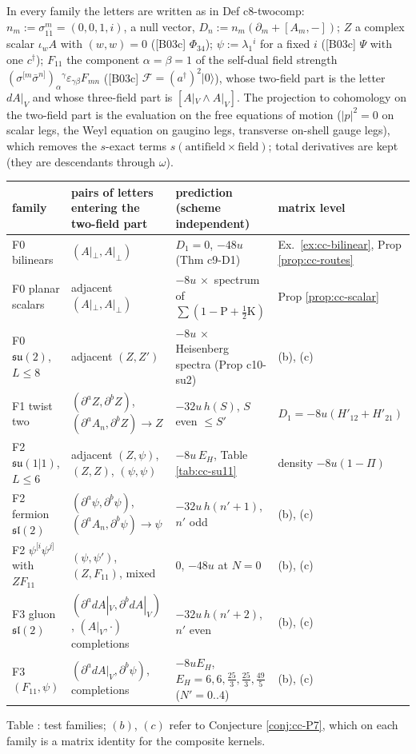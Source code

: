 \documentclass[11pt]{article}
\numberwithin{equation}{section}
\theoremstyle{plain}
\theoremstyle{definition}
\newcommand{\Ap}{A|_{\perp}}
\newcommand{\AV}{A|_V}
\begin{document}
In every family the letters are written as in Def c8-twocomp: $n_m:=\sigma^m_{1\dot1}=(0,0,1,i)$, a null vector, $D_n:=n_m(\partial_m+[A_m,-])$; $Z$ a complex scalar $\iota_wA$ with $(w,w)=0$ ([B03c] $\Phi_{34}$); $\psi:=\lambda_{1}{}^{i}$ for a fixed $i$ ([B03c] $\Psi$ with one $c^\dagger$); $F_{11}$ the component $\alpha=\beta=1$ of the self-dual field strength $(\sigma^{[m}\bar\sigma^{n]})_\alpha{}^\gamma\varepsilon_{\gamma\beta}F_{mn}$ ([B03c] $\mathcal F=(a^\dagger)^2|0\rangle$), whose two-field part is the letter $d\AV$ and whose three-field part is $[\AV\wedge\AV]$. The projection to cohomology on the two-field part is the evaluation on the free equations of motion ($|p|^2=0$ on scalar legs, the Weyl equation on gaugino legs, transverse on-shell gauge legs), which removes the $s$-exact terms $s(\text{antifield}\times\text{field})$; total derivatives are kept (they are descendants through $\omega$).

\begin{center}\small
\begin{tabular}{p{2.6cm}|p{5.2cm}|p{4.6cm}|p{3.4cm}}
family & pairs of letters entering the two-field part & prediction (scheme independent) & matrix level\\\hline
F0 bilinears & $(\Ap,\Ap)$ & $D_1=0$, $-48u$ (Thm c9-D1) & Ex.~\ref{ex:cc-bilinear}, Prop \ref{prop:cc-routes}\\
F0 planar scalars & adjacent $(\Ap,\Ap)$ & $-8u\,\times$ spectrum of $\sum(1-\mathrm P+\tfrac12\mathrm K)$ & Prop \ref{prop:cc-scalar}\\
F0 $\mathfrak{su}(2)$, $L\le8$ & adjacent $(Z,Z')$ & $-8u\,\times$ Heisenberg spectra (Prop c10-su2) & (b), (c)\\
F1 twist two & $(\partial^aZ,\partial^bZ)$, $(\partial^aA_n,\partial^bZ)\to Z$ & $-32u\,h(S)$, $S$ even $\le S'$ & $D_1=-8u(H'_{12}+H'_{21})$\\
F2 $\mathfrak{su}(1|1)$, $L\le6$ & adjacent $(Z,\psi)$, $(Z,Z)$, $(\psi,\psi)$ & $-8u\,E_H$, Table \ref{tab:cc-su11} & density $-8u(1-\Pi)$\\
F2 fermion $\mathfrak{sl}(2)$ & $(\partial^a\psi,\partial^b\psi)$, $(\partial^aA_n,\partial^b\psi)\to\psi$ & $-32u\,h(n'+1)$, $n'$ odd & (b), (c)\\
F2 $\psi^{[i}\psi^{j]}$ with $ZF_{11}$ & $(\psi,\psi')$, $(Z,F_{11})$, mixed & $0$, $-48u$ at $N=0$ & (b), (c)\\
F3 gluon $\mathfrak{sl}(2)$ & $(\partial^a d\AV,\partial^b d\AV)$, $(\AV,\cdot)$ completions & $-32u\,h(n'+2)$, $n'$ even & (b), (c)\\
F3 $(F_{11},\psi)$ & $(\partial^ad\AV,\partial^b\psi)$, completions & $-8uE_H$, $E_H=6,6,\tfrac{25}3,\tfrac{25}3,\tfrac{49}5$ ($N'=0..4$) & (b), (c)\\
\end{tabular}
\end{center}
\begin{center}\small Table \theequation\label{tab:cc-families}: test families; $(b)$, $(c)$ refer to Conjecture \ref{conj:cc-P7}, which on each family is a matrix identity for the composite kernels.\end{center}
\end{document}
